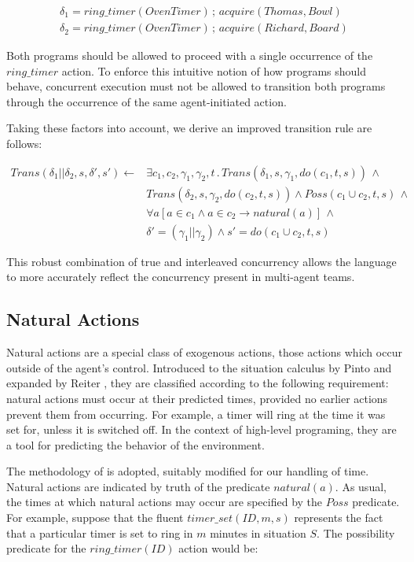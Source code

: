 \documentclass[letterpaper]{article}
\begin{document}
\begin{align*}
\delta_{1}=ring\_ timer(OvenTimer)\,;\, acquire(Thomas,Bowl)\\
\delta_{2}=ring\_ timer(OvenTimer)\,;\, acquire(Richard,Board)
\end{align*}


Both programs should be allowed to proceed with a single occurrence
of the $ring\_ timer$ action. To enforce this intuitive notion of
how programs should behave, concurrent execution must not be allowed
to transition both programs through the occurrence of the same agent-initiated
action.

Taking these factors into account, we derive an improved transition
rule are follows:

\begin{align*}
Trans(\delta_{1}||\delta_{2},s,\delta',s')\leftarrow & \exists c_{1},c_{2},\gamma_{1},\gamma_{2},t\,.\, Trans(\delta_{1},s,\gamma_{1},do(c_{1},t,s))\,\wedge\\
 & Trans(\delta_{2},s,\gamma_{2},do(c_{2},t,s))\wedge Poss(c_{1}\cup c_{2},t,s)\,\wedge\\
 & \forall a\left[a\in c_{1}\wedge a\in c_{2}\rightarrow natural(a)\right]\,\wedge\\
 & \delta'=(\gamma_{1}||\gamma_{2})\wedge s'=do(c_{1}\cup c_{2},t,s)
\end{align*}


This robust combination of true and interleaved concurrency allows
the language to more accurately reflect the concurrency present in
multi-agent teams.


\subsection{Natural Actions}

\label{sub:Natural-Actions}

Natural actions are a special class of exogenous actions, those actions
which occur outside of the agent's control. Introduced to the situation
calculus by Pinto \cite{pinto94temporal} and expanded by Reiter \cite{reiter96sc_nat_conc},
they are classified according to the following requirement: natural
actions must occur at their predicted times, provided no earlier actions
prevent them from occurring. For example, a timer will ring at the
time it was set for, unless it is switched off. In the context of
high-level programing, they are a tool for predicting the behavior
of the environment.

The methodology of \cite{reiter96sc_nat_conc} is adopted, suitably
modified for our handling of time. Natural actions are indicated by
truth of the predicate $natural(a)$. As usual, the times at which
natural actions may occur are specified by the $Poss$ predicate.
For example, suppose that the fluent $timer\_ set(ID,m,s)$ represents
the fact that a particular timer is set to ring in $m$ minutes in
situation $S$. The possibility predicate for the $ring\_ timer(ID)$
action would be:
\end{document}
